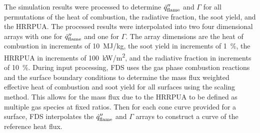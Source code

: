 The simulation results were processed to determine $\dot{q}_{\rm flame}''$ and $\Gamma$ for all permutations of the heat of combustion, the radiative fraction, the soot yield, and the HRRPUA. The processed results were interpolated into two four dimensional arrays with one for $\dot{q}_{\rm flame}''$ and one for $\Gamma$. The array dimensions are the heat of combustion in increments of 10~MJ/kg, the soot yield in increments of 1~\%, the HRRPUA in increments of 100~\unit{kW/m^2}, and the radiative fraction in increments of 10~\%. During input processing, FDS uses the gas phase combustion reactions and the surface boundary conditions to determine the mass flux weighted effective heat of combustion and soot yield for all surfaces using the scaling method. This allows for the mass flux due to the HRRPUA to be defined as multiple gas species at fixed ratios. Then for each cone curve provided for a surface, FDS interpolates the $\dot{q}_{\rm flame}''$ and $\Gamma$ arrays to construct a curve of the reference heat flux.

